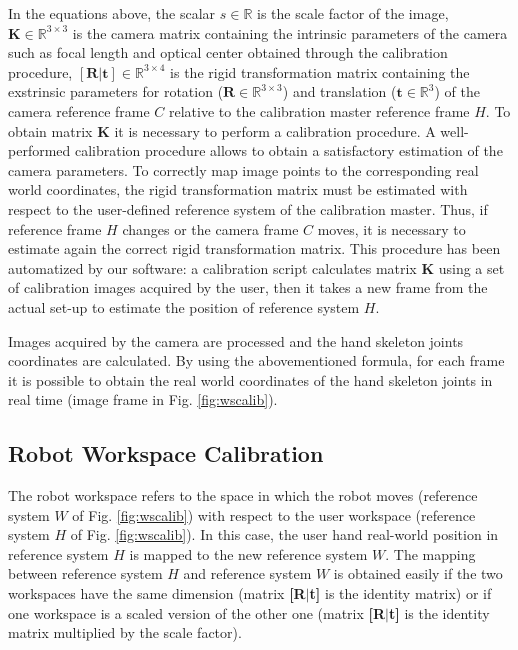 \documentclass[a4paper, 10pt, conference]{ieeeconf}      %
\begin{document}
In the equations above, the scalar $s\in\mathbb{R}$ is the scale factor of the image, $\mathbf{K}\in\mathbb{R}^{3\times3}$ is the camera matrix containing the intrinsic parameters of the camera such as focal length and optical center obtained through the calibration procedure, $\mathbf{[R|t]}\in\mathbb{R}^{3\times4}$ is the rigid transformation matrix containing the exstrinsic parameters for rotation ($\mathbf{R}\in\mathbb{R}^{3\times3}$) and translation ($\mathbf{t}\in\mathbb{R}^3$) of the camera reference frame $C$ relative to the calibration master reference frame $H$. 
To obtain matrix \textbf{K} it is necessary to perform a calibration procedure. A well-performed calibration procedure allows to obtain a satisfactory estimation of the camera parameters. To correctly map image points to the corresponding real world coordinates, the rigid transformation matrix must be estimated with respect to the user-defined reference system of the calibration master. Thus, if reference frame $H$ changes or the camera frame $C$ moves, it is necessary to estimate again the correct rigid transformation matrix. This procedure has been automatized by our software: a calibration script calculates matrix \textbf{K} using a set of calibration images acquired by the user, then it takes a new frame from the actual set-up to estimate the position of reference system $H$.

Images acquired by the camera are processed and the hand skeleton joints coordinates are calculated. By using the abovementioned formula, for each frame it is possible to obtain the real world coordinates of the hand skeleton joints in real time (image frame in Fig. \ref{fig:wscalib}).

\subsection{Robot Workspace Calibration}
The robot workspace refers to the space in which the robot moves (reference system $W$ of Fig. \ref{fig:wscalib}) with respect to the user workspace (reference system $H$ of Fig. \ref{fig:wscalib}). In this case, the user hand real-world position in reference system $H$ is mapped to the new reference system $W$. The mapping between reference system $H$ and reference system $W$ is obtained easily if the two workspaces have the same dimension (matrix \textbf{[R$|$t]} is the identity matrix) or if one workspace is a scaled version of the other one (matrix \textbf{[R$|$t]} is the identity matrix multiplied by the scale factor). %
\end{document}
